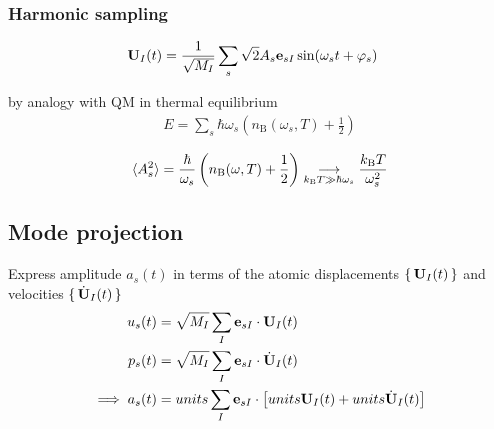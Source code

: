 \subsubsection{Harmonic sampling}

\begin{align}
	{\bf U}_I (t) 
		& = \frac{1}{\sqrt{M_I}} \sum_s \sqrt 2 A_s {\bf e}_{sI} \sin (\omega_s t + \varphi_s)
\end{align}

by analogy with QM in thermal equilibrium
\begin{align}
	E
		=\sum_{s} \hbar \omega_{s}\left(n_{\mathrm{B}}\left(\omega_{s}, T\right)+\frac{1}{2}\right)
\end{align}

\begin{align}
	\braket{A_{s}^{2}}
		= \frac{\hbar}{\omega_{s}}\left(n_{\mathrm{B}}(\omega, T)+\frac{1}{2}\right)
		\underset{k_{\rm B} T \gg \hbar \omega_s}{\longrightarrow} \frac{k_{\rm B} T}{\omega_s^2}
\end{align}

\subsection{Mode projection}

Express amplitude $a_s (t)$ in terms of the atomic displacements $\set{{\bf U}_I (t)}$ and velocities $\set{\dot{{\bf U}}_I (t)}$ 
\begin{align}
	u_s (t) 
	    & = \sqrt{M_I} \sum_I {\bf e}_{sI} \cdot {\bf U}_I (t) \\
	p_s (t)
	    & = \sqrt{M_I} \sum_I {\bf e}_{sI} \cdot \dot{{\bf U}}_I (t) \\
	\implies
	a_s (t) 
	    &= units \sum_I {\bf e}_{sI} \cdot \left[ units {\bf U}_I(t) + units \dot{{\bf U}}_I (t) \right]
\end{align}

